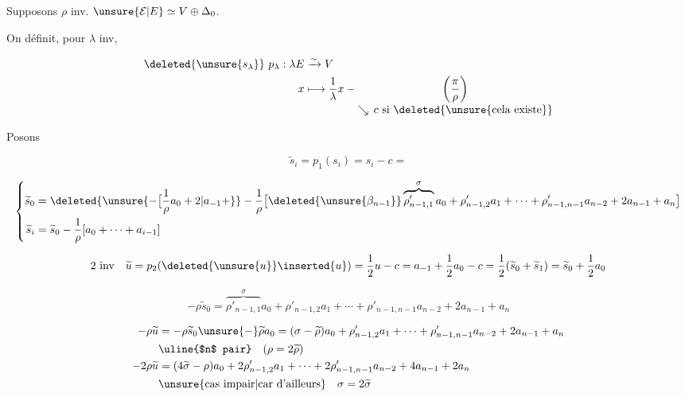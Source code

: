 
Supposons $\rho$ inv.  \qquad $\unsure{\mathcal E|E}\simeq V\oplus\Delta_0$.

On définit, pour $\lambda$ inv,

\[
\begin{aligned}
\deleted{\unsure{s_{\lambda}}}\ p_\lambda:\lambda E&\xrightarrow{\sim}V\\
x&\longmapsto \frac1\lambda x-\underset{\displaystyle\searrow\,c\ \text{si \deleted{\unsure{cela existe}}}}{\left(\frac{\pi}{\rho}\right)}
\end{aligned}
\]

Posons

\[
\widetilde{s}_i=p_1(s_i)=s_i-c=
\]

\[
\left\{\begin{aligned}
\widetilde{s}_0&=\deleted{\unsure{-\bigl[\frac{1}{\rho}a_0+2|a_{-1}+}}
-\frac1{\rho}\bigl[\deleted{\unsure{\beta_{n-1}}}
 \overbrace{\rho'_{n-1,1}}^{\sigma}a_0+\rho'_{n-1,2}a_1+
 \cdots+\rho'_{n-1,n-1}a_{n-2}+2a_{n-1}+a_n\bigr]\\
\widetilde{s}_i&=\widetilde{s}_0-\frac1{\rho}[a_0+\cdots+a_{i-1}]
\end{aligned}\right.
\]

\[
\text{2 inv}\quad
\widetilde{u}=p_2(\deleted{\unsure{u}}\inserted{u})=\frac12u-c
=a_{-1}+\frac12a_0-c=\frac12(\widetilde{s}_0+\widetilde{s}_1)
=\widetilde{s}_0+\frac12a_0
\]

\[
\boxed{-\rho\widetilde{s}_0=
 \overbrace{\rho'_{n-1,1}}^\sigma a_0+\rho'_{n-1,2}a_1+
 \cdots+\rho'_{n-1,n-1}a_{n-2}+2a_{n-1}+a_n}
\]

\[
\begin{aligned}
-\rho\widetilde{u}&=-\rho\widetilde{s}_0\unsure{-}\widetilde{\rho}a_0
=(\sigma-\widetilde{\rho})a_0+\rho'_{n-1,2}a_1+\cdots+
 \rho'_{n-1,n-1}a_{n-2}+2a_{n-1}+a_n\\
&\hfill\text{\uline{$n$ pair}}\quad(\rho=2\widetilde{\rho})\\
-2\rho\widetilde{u}&=(4\widetilde{\sigma}-\rho)a_0+2\rho'_{n-1,2}a_1+\cdots+
 2\rho'_{n-1,n-1}a_{n-2}+4a_{n-1}+2a_n\\
&\hfill\text{\unsure{cas impair|car d'ailleurs}}\quad\sigma=2\widetilde{\sigma}
\end{aligned}
\]

